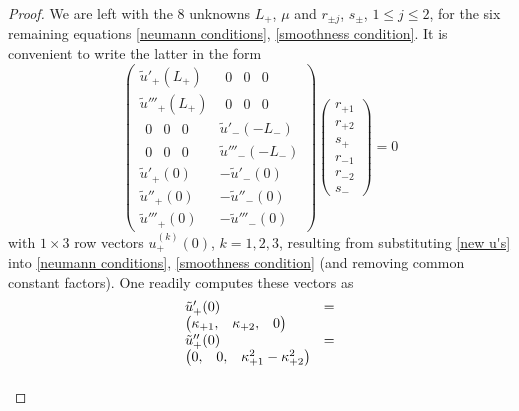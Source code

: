 \documentclass{article}
\numberwithin{equation}{section}
\begin{document}
\begin{proof}
		 We are left with the 8 unknowns $L_+$, $\mu$ and $r_{\pm j}$, $s_{\pm}$, $1 \leq j \leq 2$, for the six remaining equations  \eqref{neumann conditions}, \eqref{smoothness condition}. It is convenient to write the latter in the form  
		\begin{equation}\label{system}
			\begin{pmatrix}
				\tilde{u}'_+(L_+) & \begin{matrix} 0 & 0 & 0\end{matrix} \\
				\tilde{u}'''_+(L_+) & \begin{matrix} 0 & 0 & 0\end{matrix} \\
				\begin{matrix} 0 & 0 & 0\end{matrix} & \tilde{u}'_-(-L_-) \\
				\begin{matrix} 0 & 0 & 0\end{matrix} & \tilde{u}'''_-(-L_-) \\
				\tilde{u}'_+(0) & -\tilde{u}'_-(0) \\
				\tilde{u}''_+(0) & -\tilde{u}''_-(0) \\
				\tilde{u}'''_+(0) & -\tilde{u}'''_-(0) 
			\end{pmatrix}
			\begin{pmatrix}
				r_{+1} \\ 
				r_{+2} \\
				s_+ \\
				r_{-1} \\
				r_{-2} \\
				s_-
			\end{pmatrix} = 0
		\end{equation} 
		with $1\times 3$ row vectors $u_+^{(k)}(0)$, $k=1,2,3$, resulting from substituting \eqref{new u's} into \eqref{neumann conditions}, \eqref{smoothness condition} (and removing common constant factors). One readily computes these vectors as 
		\begin{equation}
			\begin{tabular}{p{0.31\linewidth} p{0.5\linewidth}}
				\parbox{\linewidth}{$\tilde{u}'_+(0) = \begin{pmatrix}
						\kappa_{+1}, & \kappa_{+2}, & 0
					\end{pmatrix}$ \\
					$\tilde{u}''_+(0) = \begin{pmatrix}
						0, & 0, & \kappa_{+1}^2 - \kappa_{+2}^2  
					\end{pmatrix}$ \\
}
\end{tabular}
\end{equation}
\end{proof}
\end{document}

